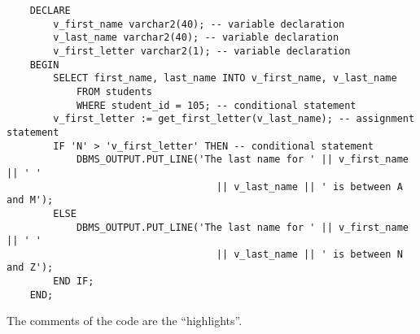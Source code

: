 \documentclass[11pt]{article}
\begin{document}
\begin{enumerate}
\begin{verbatim}
    DECLARE
        v_first_name varchar2(40); -- variable declaration
        v_last_name varchar2(40); -- variable declaration
        v_first_letter varchar2(1); -- variable declaration
    BEGIN
        SELECT first_name, last_name INTO v_first_name, v_last_name
            FROM students
            WHERE student_id = 105; -- conditional statement
        v_first_letter := get_first_letter(v_last_name); -- assignment statement
        IF 'N' > 'v_first_letter' THEN -- conditional statement
            DBMS_OUTPUT.PUT_LINE('The last name for ' || v_first_name || ' '
                                    || v_last_name || ' is between A and M');
        ELSE
            DBMS_OUTPUT.PUT_LINE('The last name for ' || v_first_name || ' '
                                    || v_last_name || ' is between N and Z');
        END IF;
    END;
\end{verbatim}

The comments of the code are the ``highlights''.
\end{enumerate}
\end{document}
